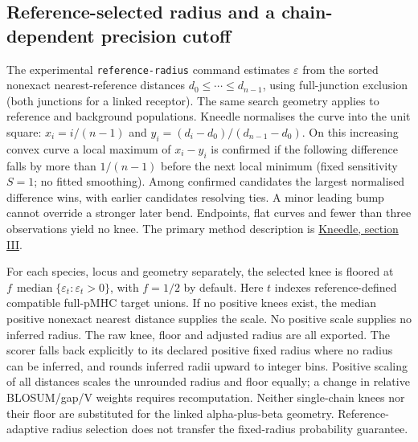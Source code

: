 \documentclass[10pt,a4paper]{article}
\theoremstyle{definition}
\begin{document}
\subsection*{Reference-selected radius and a chain-dependent precision cutoff}
The experimental \texttt{reference-radius} command estimates $\varepsilon$ from the
sorted nonexact nearest-reference distances $d_0\le\cdots\le d_{n-1}$, using
full-junction exclusion (both junctions for a linked receptor). The same search geometry
applies to reference and background populations. Kneedle normalises the curve into the
unit square: $x_i=i/(n-1)$ and $y_i=(d_i-d_0)/(d_{n-1}-d_0)$.
On this increasing convex curve a local maximum of $x_i-y_i$ is confirmed if the
following difference falls by more than $1/(n-1)$ before the next local minimum
(fixed sensitivity $S=1$; no fitted smoothing). Among confirmed candidates the largest normalised difference wins, with earlier candidates resolving ties. A minor leading bump cannot override a stronger later bend. Endpoints, flat curves and fewer
than three observations yield no knee. The primary method description is
\href{https://raghavan.usc.edu/papers/kneedle-simplex11.pdf}{Kneedle, section III}.

For each species, locus and geometry separately, the selected knee is floored at
$f\,\operatorname{median}\{\varepsilon_t:\varepsilon_t>0\}$, with $f=1/2$ by default.
Here $t$ indexes reference-defined compatible full-pMHC target unions. If no positive
knees exist, the median positive nonexact nearest distance supplies the scale.
No positive scale supplies no inferred radius. The raw knee, floor and adjusted radius
are all exported. The scorer falls back explicitly to its declared positive fixed
radius where no radius can be inferred, and rounds inferred radii upward to integer
bins. Positive scaling of all distances scales the unrounded radius and floor equally;
a change in relative BLOSUM/gap/V weights requires recomputation. Neither single-chain
knees nor their floor are substituted for the linked alpha-plus-beta geometry.
Reference-adaptive radius selection does not transfer the fixed-radius probability guarantee.
\end{document}
